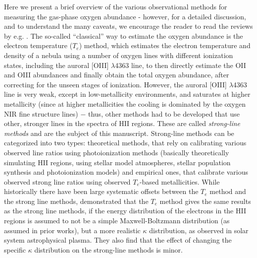 \documentclass{emulateapj}
\begin{document}
Here we present a brief overview of the various observational methods for measuring the gas-phase oxygen abundance - however, for a detailed discussion, and to understand the many caveats, we encourage the reader to read the reviews by e.g. \citet{stasinska02,kewley08,moustakas10,stasinska10,dopita13,blanc15}.
The so-called ``classical'' way to estimate the oxygen abundance is the electron temperature ($T_e$) method, which estimates the electron temperature and density of a nebula using a number of oxygen lines with different ionization states, including the auroral [OIII] $\lambda$4363 line, to then directly estimate the OII and OIII abundances and finally obtain the total oxygen abundance, after correcting for the unseen stages of ionization. However, the auroral [OIII] $\lambda$4363 line is very weak, except in low-metallicity environments, and saturates at higher metallicity (since at higher metallicities the cooling is dominated by the oxygen NIR fine structure lines)
$-$ thus, other methods had to be developed that use other, stronger lines in the spectra of HII regions. These are called \emph{strong-line methods} and are the subject of this manuscript. Strong-line methods can be categorized into two types: theoretical methods, that rely on calibrating various observed line ratios using photoionization methods (basically theoretically simulating HII regions, using stellar model atmospheres, stellar population synthesis and photoionization models) and empirical ones, that calibrate various observed strong line ratios using observed $T_e$-based metallicities. While historically there have been large systematic offsets between the $T_e$ method and the strong line methods, \citet{dopita13} demonstrated that the $T_e$ method gives the same results as the strong line methods, if the energy distribution of the electrons in the HII regions is assumed to not be a simple Maxwell-Boltzmann distribution (as assumed in prior works), but a more realistic $\kappa$ distribution, as observed in solar system astrophysical plasma. They also find that the effect of changing the specific $\kappa$ distribution on the strong-line methods is minor. 
\end{document}
